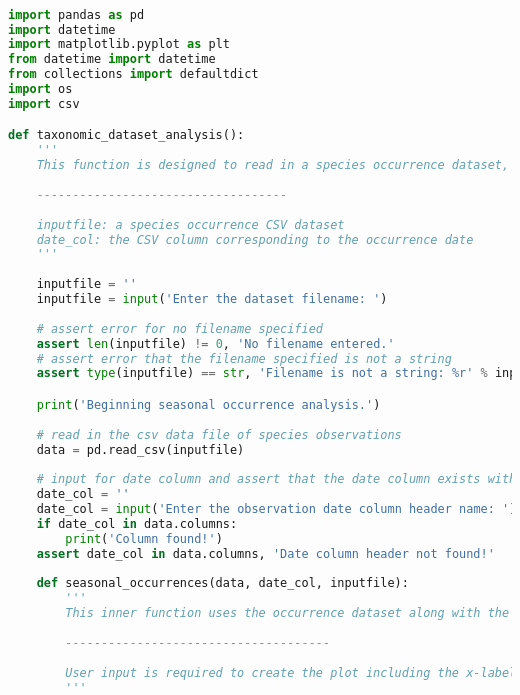 \documentclass[letterpaper]{article}
\begin{document}
\newpage
\begin{lstlisting}[language=Python]

import pandas as pd
import datetime
import matplotlib.pyplot as plt
from datetime import datetime
from collections import defaultdict
import os
import csv

def taxonomic_dataset_analysis():
    '''
    This function is designed to read in a species occurrence dataset, analyze the data, and create useful outputs for understanding taxon occurrences 	throughout seasons. The function also outputs a CSV file that contains the counts of each unique taxon in the dataset in respect to the taxonomic rank specified by the user.
    
    -----------------------------------
    
    inputfile: a species occurrence CSV dataset
    date_col: the CSV column corresponding to the occurrence date
    '''
    
    inputfile = ''
    inputfile = input('Enter the dataset filename: ')
    
    # assert error for no filename specified
    assert len(inputfile) != 0, 'No filename entered.'
    # assert error that the filename specified is not a string
    assert type(inputfile) == str, 'Filename is not a string: %r' % inputfile

    print('Beginning seasonal occurrence analysis.')
    
    # read in the csv data file of species observations
    data = pd.read_csv(inputfile)
    
    # input for date column and assert that the date column exists within dataset
    date_col = ''
    date_col = input('Enter the observation date column header name: ')
    if date_col in data.columns:
        print('Column found!')
    assert date_col in data.columns, 'Date column header not found!'
        
    def seasonal_occurrences(data, date_col, inputfile):
        '''
        This inner function uses the occurrence dataset along with the date column specified to  create a histogram displaying specified taxonomic rank occurrences by season. The use of this is to visualize the seasonal distribution of species or to understand when people upload species observations to online databases such as iNaturalist.
        
        -------------------------------------
        
        User input is required to create the plot including the x-label, the y-label, and the title.
        '''


\end{lstlisting}
\end{document}

